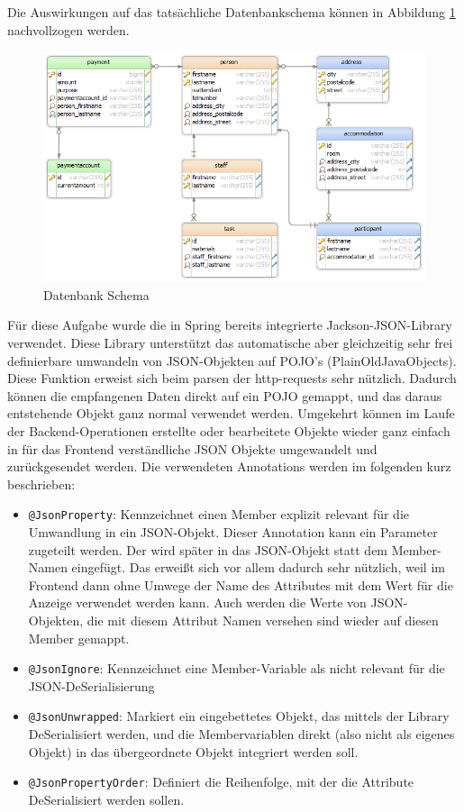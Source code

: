 Die Auswirkungen auf das tatsächliche Datenbankschema können in Abbildung \ref{fig:db_scheme} nachvollzogen werden.

\begin{figure}[h]
	\centering
	\includegraphics[width=0.9\linewidth]{3_backend/pics/db_scheme}
	\caption{Datenbank Schema}
	\label{fig:db_scheme}
\end{figure}


Für diese Aufgabe wurde die in Spring bereits integrierte Jackson-JSON-Library verwendet. Diese Library unterstützt das automatische aber gleichzeitig sehr frei definierbare umwandeln von JSON-Objekten auf POJO's (PlainOldJavaObjects). Diese Funktion erweist sich beim parsen der http-requests sehr nützlich. Dadurch können die empfangenen Daten direkt auf ein POJO gemappt, und das daraus entstehende Objekt ganz normal verwendet werden. Umgekehrt können im Laufe der Backend-Operationen erstellte oder bearbeitete Objekte wieder ganz einfach in für das Frontend verständliche JSON Objekte umgewandelt und zurückgesendet werden. Die verwendeten Annotations werden im folgenden kurz beschrieben:

\begin{itemize}
	\item \verb|@JsonProperty|: Kennzeichnet einen Member explizit relevant für die Umwandlung in ein JSON-Objekt. Dieser Annotation kann ein Parameter zugeteilt werden. Der wird später in das JSON-Objekt statt dem Member-Namen eingefügt. Das erweißt sich vor allem dadurch sehr nützlich, weil im Frontend dann ohne Umwege der Name des Attributes mit dem Wert für die Anzeige verwendet werden kann. Auch werden die Werte von JSON-Objekten, die mit diesem Attribut Namen versehen sind wieder auf diesen Member gemappt.
	\item \verb|@JsonIgnore|: Kennzeichnet eine Member-Variable als nicht relevant für die JSON-DeSerialisierung
	\item \verb|@JsonUnwrapped|: Markiert ein eingebettetes Objekt, das mittels der Library DeSerialisiert werden, und die Membervariablen direkt (also nicht als eigenes Objekt) in das übergeordnete Objekt integriert werden soll.
	\item \verb|@JsonPropertyOrder|: Definiert die Reihenfolge, mit der die Attribute DeSerialisiert werden sollen.
\end{itemize}

